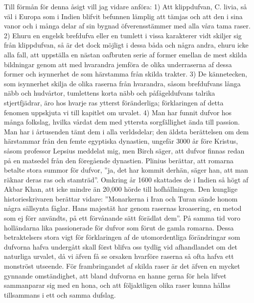 Till förmån för denna åsigt vill jag vidare anföra: 1) Att klippdufvan, C. livia, så väl i Europa som i Indien blifvit befunnen lämplig att tämjas och att den i sina vanor och i många delar af sin bygnad öfverensstämmer med alla våra tama raser. 2) Ehuru en engelsk brefdufva eller en tumlett i vissa karakterer vidt skiljer sig från klippdufvan, så är det dock möjligt i dessa båda och några andra, ehuru icke alla fall, att uppställa en nästan oafbruten serie af former emellan de mest skilda bildningar genom att med hvarandra jemföra de olika underraserna af dessa former och isynnerhet de som härstamma från skilda trakter. 3) De kännetecken, som isynnerhet skilja de olika raserna från hvarandra, såsom brefdufvans långa näbb och hudvårtor, tumlettens korta näbb och påfågeldufvans talrika stjertfjädrar, äro hos hvarje ras ytterst föränderliga; förklaringen af detta fenomen uppskjuta vi till kapitlet om urvalet. 4) Man har funnit dufvor hos många folkslag, hvilka vårdat dem med yttersta sorgfällighet ända till passion. Man har i årtusenden tämt dem i alla verldsdelar; den äldsta berättelsen om dem härstammar från den femte egyptiska dynastien, ungefär 3000 år före Kristus, såsom professor Lepsius meddelat mig, men Birch säger, att dufvor finnas redan på en matsedel från den föregående dynastien. Plinius berättar, att romarna betalte stora summor för dufvor, ”ja, det har kommit derhän, säger han, att man räknar deras ras och stamträd”. Omkring år 1600 skattades de i Indien så högt af Akbar Khan, att icke mindre än 20,000 hörde till hofhållningen. Den kunglige historieskrivaren berättar vidare: ”Monarkerna i Iran och Turan sände honom några sällsynta fåglar. Hans majestät har genom rasernas kroasering, en metod som ej förr användts, på ett förvånande sätt förädlat dem”. På samma tid voro holländarna lika passionerade för dufvor som förut de gamla romarna. Dessa betraktelsers stora vigt för förklaringen af de utomordentliga förändringar som dufvorna hafva undergått skall först blifva oss tydlig vid afhandlandet om det naturliga urvalet, då vi äfven få se orsaken hvarföre raserna så ofta hafva ett monströst utseende. För frambringandet af skilda raser är det äfven en mycket gynnande omständighet, att bland dufvorna en hanne gerna för hela lifvet sammanparar sig med en hona, och att följaktligen olika raser kunna hållas tillsammans i ett och samma dufslag.

